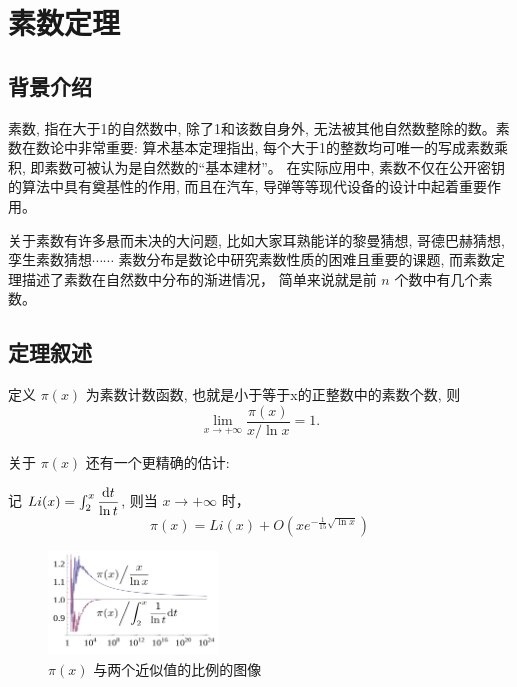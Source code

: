 \documentclass[main]{subfiles}
\def\dif{\textup{d}}
\begin{document}
\renewcommand{\filename}{素数定理}%
\section{素数定理}
\subsection*{背景介绍}
素数, 指在大于1的自然数中, 除了1和该数自身外, 无法被其他自然数整除的数。素数在数论中非常重要: 算术基本定理指出, 每个大于1的整数均可唯一的写成素数乘积, 即素数可被认为是自然数的“基本建材”。
在实际应用中, 素数不仅在公开密钥的算法中具有奠基性的作用, 而且在汽车, 导弹等等现代设备的设计中起着重要作用。
\par 关于素数有许多悬而未决的大问题, 比如大家耳熟能详的黎曼猜想, 哥德巴赫猜想, 孪生素数猜想$\cdots \cdots$ 素数分布是数论中研究素数性质的困难且重要的课题, 而素数定理描述了素数在自然数中分布的渐进情况， 简单来说就是前 $n$ 个数中有几个素数。
\subsection{定理叙述}
\begin{theorem}[素数定理]
    定义 $\pi(x)$ 为素数计数函数, 也就是小于等于x的正整数中的素数个数, 则
    \[ \lim_{x \rightarrow + \infty} \frac{\pi(x)}{x/ \ln x} = 1. \]
\end{theorem}
关于 $\pi(x)$ 还有一个更精确的估计: 
\begin{theorem}[另一个估计]
    记 $Li(x) = \int_{2}^{x} \dfrac{\dif t}{\ln t}$, 则当 $x \rightarrow + \infty$ 时，
    \[ \pi(x) = Li(x) + O(xe^{-\frac{1}{15} \sqrt{\ln x}}) \]
    
\end{theorem}

\begin{figure}[H]
	\centering
		\includegraphics[width=0.40\textwidth]{pnt1.png}
		 \caption{$\pi(x)$ 与两个近似值的比例的图像}
\end{figure}
\end{document}
